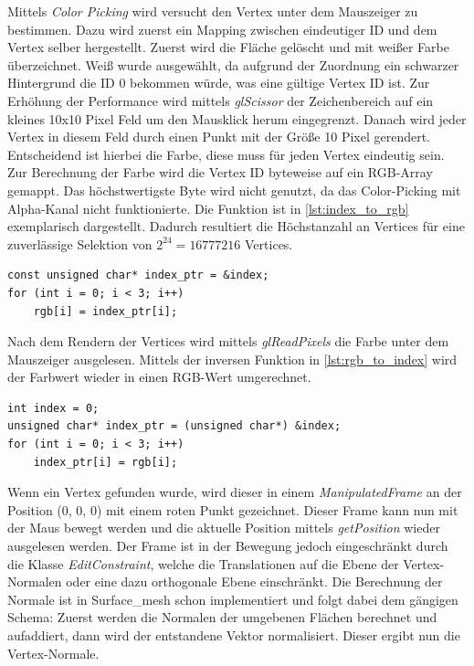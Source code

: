 Mittels \emph{Color Picking} wird versucht den Vertex unter dem Mauszeiger zu bestimmen.
Dazu wird zuerst ein Mapping zwischen eindeutiger ID und dem Vertex selber hergestellt.
Zuerst wird die Fläche gelöscht und mit weißer Farbe überzeichnet.
Weiß wurde ausgewählt, da aufgrund der Zuordnung ein schwarzer Hintergrund die ID 0 bekommen würde, was eine gültige Vertex ID ist.
Zur Erhöhung der Performance wird mittels \emph{glScissor} der Zeichenbereich auf ein kleines 10x10 Pixel Feld um den Mausklick herum eingegrenzt.
Danach wird jeder Vertex in diesem Feld durch einen Punkt mit der Größe 10 Pixel gerendert.
Entscheidend ist hierbei die Farbe, diese muss für jeden Vertex eindeutig sein.
Zur Berechnung der Farbe wird die Vertex ID byteweise auf ein RGB-Array gemappt.
Das höchstwertigste Byte wird nicht genutzt, da das Color-Picking mit Alpha-Kanal nicht funktionierte.
Die Funktion ist in \autoref{lst:index_to_rgb} exemplarisch dargestellt.
Dadurch resultiert die Höchstanzahl an Vertices für eine zuverlässige Selektion von $2^{24} = 16777216$ Vertices.

\begin{lstlisting}[style=myCppStyle, caption={Umrechnung Index nach Farbwert}, label=lst:index_to_rgb]
const unsigned char* index_ptr = &index;
for (int i = 0; i < 3; i++)
	rgb[i] = index_ptr[i];
\end{lstlisting}

Nach dem Rendern der Vertices wird mittels \emph{glReadPixels} die Farbe unter dem Mauszeiger ausgelesen.
Mittels der inversen Funktion in \autoref{lst:rgb_to_index} wird der Farbwert wieder in einen RGB-Wert umgerechnet.

\begin{lstlisting}[style=myCppStyle, caption={Inverse Funktion: Farbwert nach Index}, label=lst:rgb_to_index]
int index = 0;
unsigned char* index_ptr = (unsigned char*) &index;
for (int i = 0; i < 3; i++)
	index_ptr[i] = rgb[i];
\end{lstlisting}

Wenn ein Vertex gefunden wurde, wird dieser in einem \emph{ManipulatedFrame} an der Position (0, 0, 0) mit einem roten Punkt gezeichnet. 
Dieser Frame kann nun mit der Maus bewegt werden und die aktuelle Position mittels \emph{getPosition} wieder ausgelesen werden.
Der Frame ist in der Bewegung jedoch eingeschränkt durch die Klasse \emph{EditConstraint}, welche die Translationen auf die Ebene der Vertex-Normalen oder eine dazu orthogonale Ebene einschränkt.
Die Berechnung der Normale ist in Surface\_mesh schon implementiert und folgt dabei dem gängigen Schema:
Zuerst werden die Normalen der umgebenen Flächen berechnet und aufaddiert, dann wird der entstandene Vektor normalisiert. 
Dieser ergibt nun die Vertex-Normale.

